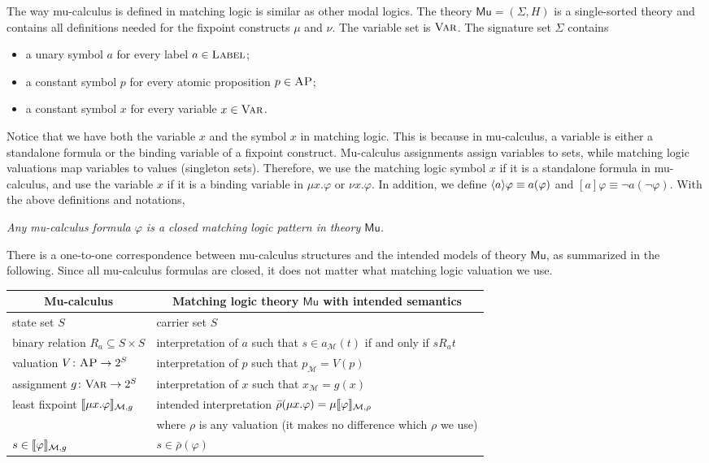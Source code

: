 \documentclass[acmsmall,review,anonymous]{acmart}
\newcommand{\Var}{\textnormal{\textsc{Var}}}
\newcommand{\sig}{\mathbb{\Sigma}}
\newcommand{\MM}{\mathcal{M}}
\newcommand{\pset}[1]{2^{#1}}
\newcommand{\barrho}{\bar{\rho}}
\newcommand{\MLMu}{\mathsf{Mu}}
\newcommand{\AP}{\textsc{AP}}
\newcommand{\Label}{\textsc{Label}}
\DeclarePairedDelimiter{\bracket}{\llbracket}{\rrbracket}
\DeclarePairedDelimiter{\angleBraces}{\langle}{\rangle}
\begin{document}
The way mu-calculus is defined in matching logic is similar
as other modal logics.
The theory $\MLMu = (\sig, H)$ is a single-sorted theory and
contains all definitions needed for 
the fixpoint constructs $\mu$ and $\nu$.
The variable set is $\Var$.
The signature set $\Sigma$ contains
\begin{itemize}
\item a unary symbol $a$ for every label $a \in \Label$; 
\item a constant symbol $p$ for every atomic proposition $p \in \AP$;
\item a constant symbol $x$ for every variable $x \in \Var$.
\end{itemize}
Notice that we have both the variable $x$ and the symbol $x$ in matching logic.
This is because in mu-calculus, a variable is either a standalone formula or
the binding variable of a fixpoint construct.
Mu-calculus assignments assign variables to sets, while matching logic valuations
map variables to values (singleton sets).
Therefore, we use the matching logic symbol $x$ if it is a standalone formula in mu-calculus,
and use the variable $x$ if it is a binding variable in $\mu x . \varphi$ or $\nu x . \varphi$.
In addition, we define $\angleBraces{a}\varphi \equiv a(\varphi)$
and $[a]\varphi \equiv \neg a(\neg \varphi)$.
With the above definitions and notations,
\begin{center}
\em
Any mu-calculus formula $\varphi$ is a closed matching logic pattern
in theory $\MLMu$.
\end{center}

There is a one-to-one correspondence between
mu-calculus structures and the intended models of theory $\MLMu$,
as summarized in the following.
Since all mu-calculus formulas are closed,
it does not matter what matching logic valuation we use.
\begin{center}
\begin{tabular}{ll}
\multicolumn{1}{c}{Mu-calculus} & 
\multicolumn{1}{c}{Matching logic theory $\MLMu$ with intended semantics}
\\\hline
state set $S$ & carrier set $S$
\\
binary relation $R_a \subseteq S \times S$ & interpretation of $a$ such that
$s \in a_\MM (t)$ if and only if $s R_a t$
\\
valuation $V \colon \AP \to \pset{S}$
& interpretation of $p$ such that $p_\MM = V(p)$
\\
assignment $g \colon \Var \to \pset{S}$
& interpretation of $x$ such that $x_\MM = g(x)$
\\
least fixpoint $\bracket{\mu x . \varphi}_{\MM,g}$
&
intended interpretation $\barrho(\mu x . \varphi) = \mu \bracket{\varphi}_{\MM,\rho}$
\\&
where $\rho$ is any valuation (it makes no difference which $\rho$ we use)
\\
$s \in \bracket{\varphi}_{\MM,g}$
& $s \in \barrho(\varphi)$
\end{tabular}
\end{center}
\end{document}
